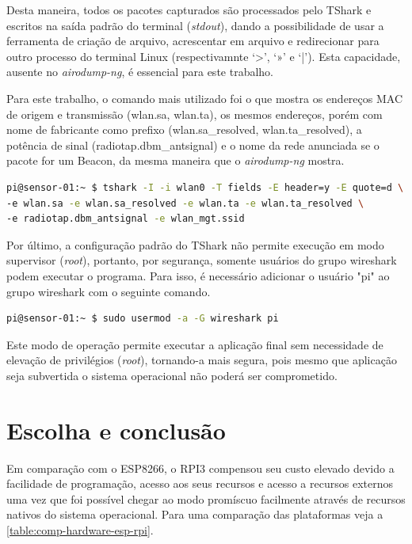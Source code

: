 Desta maneira, todos os pacotes capturados são processados pelo TShark e
escritos na saída padrão do terminal (\emph{stdout}), dando a possibilidade de
usar a ferramenta de criação de arquivo, acrescentar em arquivo e redirecionar
para outro processo do terminal Linux (respectivamnte ‘>’, ‘»’ e ‘|’). Esta
capacidade, ausente no \emph{airodump-ng}, é essencial para este trabalho.

Para este trabalho, o comando mais utilizado foi o que mostra os endereços MAC
de origem e transmissão (wlan.sa, wlan.ta), os mesmos endereços, porém com nome
de fabricante como prefixo (wlan.sa\_resolved, wlan.ta\_resolved), a potência de
sinal (radiotap.dbm\_antsignal) e o nome da rede anunciada se o pacote for um
Beacon, da mesma maneira que o \emph{airodump-ng} mostra.

\begin{lstlisting}[language=bash,caption={TShark e opções},label=code-tshark]
pi@sensor-01:~ $ tshark -I -i wlan0 -T fields -E header=y -E quote=d \
-e wlan.sa -e wlan.sa_resolved -e wlan.ta -e wlan.ta_resolved \
-e radiotap.dbm_antsignal -e wlan_mgt.ssid
\end{lstlisting}

Por último, a configuração padrão do TShark não permite execução em modo
supervisor (\emph{root}), portanto, por segurança, somente usuários do grupo
wireshark podem executar o programa. Para isso, é necessário adicionar o
usuário "pi"  ao grupo wireshark com o seguinte comando.

\begin{lstlisting}[language=bash,caption={Adição do usuário pi ao grupo wireshark},label=code-usermod]
pi@sensor-01:~ $ sudo usermod -a -G wireshark pi
\end{lstlisting}

Este modo de operação permite executar a aplicação final sem necessidade de
elevação de privilégios (\emph{root}), tornando-a mais segura, pois mesmo que
aplicação seja subvertida o sistema operacional não poderá ser comprometido.

\section{Escolha e conclusão}
\label{sec:escolha-plataforma}

Em comparação com o ESP8266, o RPI3 compensou seu custo elevado devido a
facilidade de programação, acesso aos seus recursos e acesso a recursos externos uma
vez que foi possível chegar ao modo promíscuo facilmente através de recursos nativos do
sistema operacional. Para uma comparação das plataformas veja a \autoref{table:comp-hardware-esp-rpi}.

